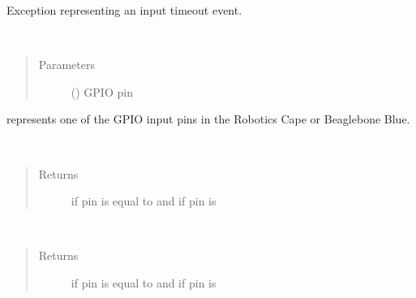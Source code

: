 \documentclass[letterpaper,10pt,english]{sphinxmanual}
\begin{document}
\begin{fulllineitems}
\label{\detokenize{index:rcpy.gpio.InputTimeout}}
Exception representing an input timeout event.

\end{fulllineitems}


\begin{fulllineitems}
\label{\detokenize{index:rcpy.gpio.Input}}~\begin{quote}\begin{description}
\item[{Parameters}] \leavevmode
{} () \textendash{} GPIO pin

\end{description}\end{quote}

{\hyperref[\detokenize{index:rcpy.gpio.Input}]{}} represents one of the GPIO input pins in the Robotics Cape or Beaglebone Blue.

\begin{fulllineitems}
\label{\detokenize{index:rcpy.gpio.Input.is_high}}~\begin{quote}\begin{description}
\item[{Returns}] \leavevmode
{} if pin is equal to {\hyperref[\detokenize{index:rcpy.gpio.HIGH}]{}} and  if pin is {\hyperref[\detokenize{index:rcpy.gpio.LOW}]{}}

\end{description}\end{quote}

\end{fulllineitems}


\begin{fulllineitems}
\label{\detokenize{index:rcpy.gpio.Input.is_low}}~\begin{quote}\begin{description}
\item[{Returns}] \leavevmode
{} if pin is equal to {\hyperref[\detokenize{index:rcpy.gpio.LOW}]{}} and  if pin is {\hyperref[\detokenize{index:rcpy.gpio.HIGH}]{}}


\end{description}
\end{quote}
\end{fulllineitems}
\end{fulllineitems}
\end{document}
